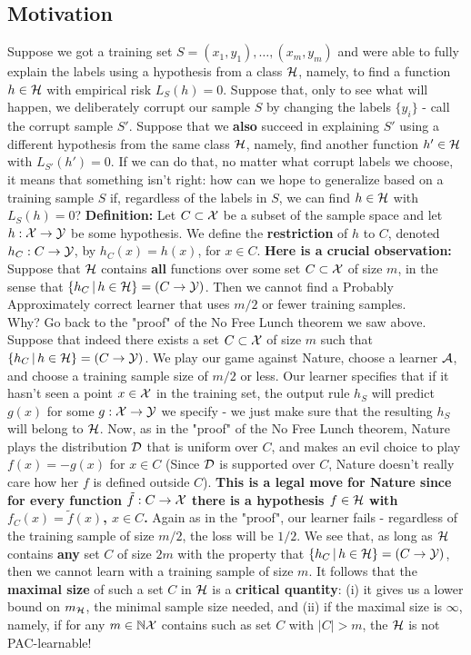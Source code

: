 {\subsection{Motivation}

Suppose we got a training set $S = (x_1,y_1),\ldots,(x_m,y_m)$ and were able to fully explain the labels using a hypothesis from a class $\mathcal{H}$, namely, to find a function $h\in\mathcal{H}$ with empirical risk $L_S(h)=0$. Suppose that, only to see what will happen, we deliberately corrupt our sample $S$ by changing the labels $\{y_i\}$ - call the corrupt sample $S'$. Suppose that we  {\bf also} succeed in explaining $S'$  using a different hypothesis from the same class $\mathcal{H}$, namely, find another function $h'\in\mathcal{H}$ with $L_{S'}(h')=0$. If we can do that, no matter what corrupt labels we choose, it means that something isn't right: how can we hope to generalize based on a training sample $S$ if, regardless of the labels in $S$, we can find $h\in\mathcal{H}$ with $L_S(h)=0$? 
\vspace{3mm}
{\bf Definition:} Let $C\subset\mathcal{X}$ be a subset of the sample space and let $h:\mathcal{X}\to\mathcal{Y}$ be some hypothesis. 
We define the {\bf restriction} of $h$ to $C$, denoted $h_C:C\to\mathcal{Y}$, by $h_C(x)=h(x)$, for $x\in C$.
\vspace{3mm}
{\bf Here is a crucial observation:} Suppose that $\mathcal{H}$ contains {\bf all} functions over some set $C\subset\mathcal{X}$ of size $m$, in the sense that $\{h_C\,|\,h\in\mathcal{H}\} = (C\to\mathcal{Y})$. Then we cannot find a Probably Approximately correct learner that uses $m/2$ or fewer training samples.\\
Why? Go back to the "proof" of the No Free Lunch theorem we saw above. Suppose that indeed there exists a set $C\subset \mathcal{X}$ of size $m$ such that $\{h_C\,|\,h\in\mathcal{H}\} = (C\to\mathcal{Y})$. We play our game against Nature, choose a learner $\mathcal{A}$, and choose a training sample size of $m/2$ or less. Our learner specifies that if it hasn't seen a point $x\in\mathcal{X}$ in the training set, the output rule $h_S$ will predict $g(x)$ for some $g:\mathcal{X}\to\mathcal{Y}$ we specify - we just make sure that the resulting $h_S$ will belong to $\mathcal{H}$. 
Now, as in the "proof" of the No Free Lunch theorem, Nature plays the distribution $\mathcal{D}$ that is uniform over  $C$, and makes an evil choice to play $f(x)=-g(x)$ for $x\in C$ (Since $\mathcal{D}$ is supported over $C$, Nature doesn't really care how her $f$ is defined outside $C$). {\bf This is a legal move for Nature since for every function $\tilde{f}:C\to\mathcal{X}$ there is a hypothesis $f\in\mathcal{H}$ with $f_C(x)=\tilde{f}(x)$, $x\in C$.} Again as in the "proof", our learner fails - regardless of the training sample of size $m/2$, the loss will be $1/2$.
\vspace{3mm}
We see that, as long as $\mathcal{H}$ contains {\bf any} set $C$ of size $2m$ with the property that $\{h_C\,|\,h\in\mathcal{H}\} = (C\to\mathcal{Y})$, then we cannot learn with a training sample of size $m$. It follows that the {\bf maximal size} of such a set $C$ in $\mathcal{H}$ is a {\bf critical quantity}: (i) it gives us a lower bound on $m_{\mathcal{H}}$, the minimal sample size needed, and (ii) if the maximal size is $\infty$, namely, if for any $m\in\mathbb{N} \mathcal{X}$ contains such as set $C$ with $|C|>m$, the $\mathcal{H}$ is not PAC-learnable!

}
